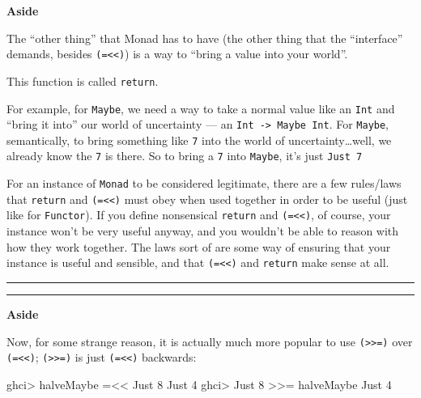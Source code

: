 \documentclass[]{article}
\newenvironment{Shaded}{}{}
\newcommand{\DataTypeTok}[1]{\textcolor[rgb]{0.56,0.13,0.00}{#1}}
\newcommand{\DecValTok}[1]{\textcolor[rgb]{0.25,0.63,0.44}{#1}}
\newcommand{\FunctionTok}[1]{\textcolor[rgb]{0.02,0.16,0.49}{#1}}
\newcommand{\NormalTok}[1]{#1}
\begin{document}
\textbf{Aside}

The ``other thing'' that Monad has to have (the other thing that the
``interface'' demands, besides \texttt{(=\textless{}\textless{})}) is a way to
``bring a value into your world''.

This function is called \texttt{return}.

For example, for \texttt{Maybe}, we need a way to take a normal value like an
\texttt{Int} and ``bring it into'' our world of uncertainty --- an
\texttt{Int\ -\textgreater{}\ Maybe\ Int}. For \texttt{Maybe}, semantically, to
bring something like \texttt{7} into the world of uncertainty\ldots{}well, we
already know the \texttt{7} is there. So to bring a \texttt{7} into
\texttt{Maybe}, it's just \texttt{Just\ 7}

For an instance of \texttt{Monad} to be considered legitimate, there are a few
rules/laws that \texttt{return} and \texttt{(=\textless{}\textless{})} must obey
when used together in order to be useful (just like for \texttt{Functor}). If
you define nonsensical \texttt{return} and \texttt{(=\textless{}\textless{})},
of course, your instance won't be very useful anyway, and you wouldn't be able
to reason with how they work together. The laws sort of are some way of ensuring
that your instance is useful and sensible, and that
\texttt{(=\textless{}\textless{})} and \texttt{return} make sense at all.

\begin{center}\rule{0.5\linewidth}{\linethickness}\end{center}

\begin{center}\rule{0.5\linewidth}{\linethickness}\end{center}

\textbf{Aside}

Now, for some strange reason, it is actually much more popular to use
\texttt{(\textgreater{}\textgreater{}=)} over
\texttt{(=\textless{}\textless{})}; \texttt{(\textgreater{}\textgreater{}=)} is
just \texttt{(=\textless{}\textless{})} backwards:

\begin{Shaded}
\begin{Highlighting}[]
\NormalTok{ghci}\FunctionTok{>}\NormalTok{ halveMaybe }\FunctionTok{=<<} \DataTypeTok{Just} \DecValTok{8}
\DataTypeTok{Just} \DecValTok{4}
\NormalTok{ghci}\FunctionTok{>} \DataTypeTok{Just} \DecValTok{8} \FunctionTok{>>=}\NormalTok{ halveMaybe}
\DataTypeTok{Just} \DecValTok{4}
\end{Highlighting}
\end{Shaded}
\end{document}
